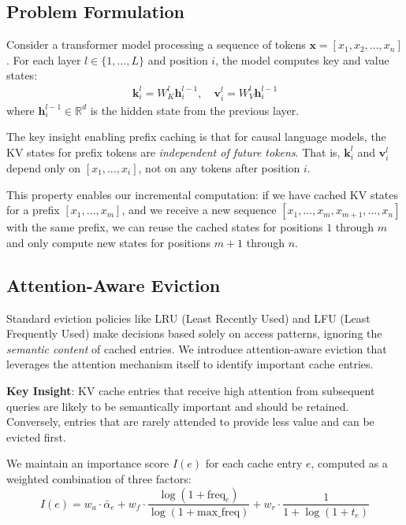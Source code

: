 \documentclass{article}
\begin{document}
\subsection{Problem Formulation}

Consider a transformer model processing a sequence of tokens $\mathbf{x} = [x_1, x_2, \ldots, x_n]$.
For each layer $l \in \{1, \ldots, L\}$ and position $i$, the model computes key and value states:
\begin{align}
    \mathbf{k}_i^l = W_K^l \mathbf{h}_i^{l-1}, \quad \mathbf{v}_i^l = W_V^l \mathbf{h}_i^{l-1}
\end{align}
where $\mathbf{h}_i^{l-1} \in \mathbb{R}^d$ is the hidden state from the previous layer.

The key insight enabling prefix caching is that for causal language models, the KV states for prefix tokens are \textit{independent of future tokens}.
That is, $\mathbf{k}_i^l$ and $\mathbf{v}_i^l$ depend only on $[x_1, \ldots, x_i]$, not on any tokens after position $i$.

This property enables our incremental computation: if we have cached KV states for a prefix $[x_1, \ldots, x_m]$, and we receive a new sequence $[x_1, \ldots, x_m, x_{m+1}, \ldots, x_n]$ with the same prefix, we can reuse the cached states for positions $1$ through $m$ and only compute new states for positions $m+1$ through $n$.

\subsection{Attention-Aware Eviction}

Standard eviction policies like LRU (Least Recently Used) and LFU (Least Frequently Used) make decisions based solely on access patterns, ignoring the \emph{semantic content} of cached entries.
We introduce attention-aware eviction that leverages the attention mechanism itself to identify important cache entries.

\textbf{Key Insight}: KV cache entries that receive high attention from subsequent queries are likely to be semantically important and should be retained.
Conversely, entries that are rarely attended to provide less value and can be evicted first.

We maintain an importance score $I(e)$ for each cache entry $e$, computed as a weighted combination of three factors:
\begin{equation}
    I(e) = w_a \cdot \bar{\alpha}_e + w_f \cdot \frac{\log(1 + \text{freq}_e)}{\log(1 + \text{max\_freq})} + w_r \cdot \frac{1}{1 + \log(1 + t_e)}
    \label{eq:importance}
\end{equation}
\end{document}
